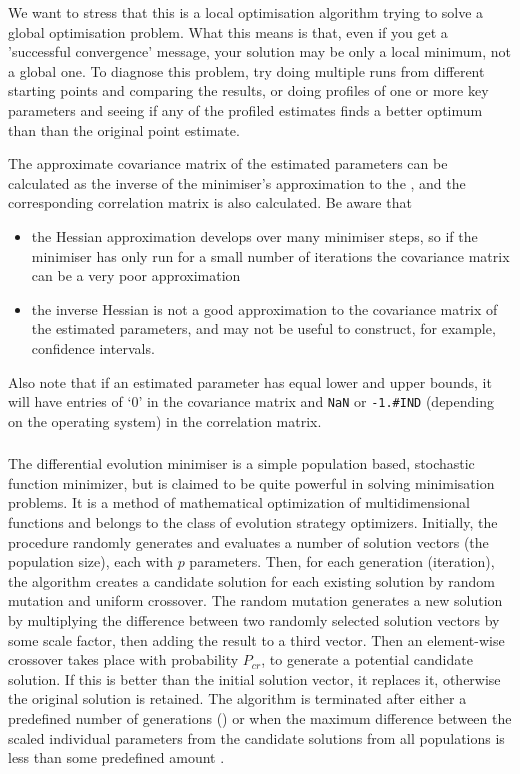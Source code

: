 We want to stress that this is a local optimisation algorithm trying to solve a global optimisation problem. What this means is that, even if you get a 'successful convergence' message, your solution may be only a local minimum, not a global one. To diagnose this problem, try doing multiple runs from different starting points and comparing the results, or doing profiles of one or more key parameters and seeing if any of the profiled estimates finds a better optimum than than the original point estimate.

The approximate covariance matrix of the estimated parameters can be calculated as the inverse of the minimiser's approximation to the , and the corresponding correlation matrix is also calculated. Be aware that

\begin{itemize}
\item the Hessian approximation develops over many minimiser steps, so if the minimiser has only run for a small number of iterations the covariance matrix can be a very poor approximation
\item the inverse Hessian is not a good approximation to the covariance matrix of the estimated parameters, and may not be useful to construct, for example, confidence intervals. 
\end{itemize}

Also note that if an estimated parameter has equal lower and upper bounds, it will have entries of `0' in the covariance matrix and \texttt{NaN} or \texttt{-1.\#IND} (depending on the operating system) in the correlation matrix. 

\subsubsection{}

The differential evolution minimiser is a simple population based, stochastic function minimizer, but is claimed to be quite powerful in solving minimisation problems. It is a method of mathematical optimization of multidimensional functions and belongs to the class of evolution strategy optimizers. Initially, the procedure randomly generates and evaluates a number of solution vectors (the population size), each with $p$ parameters. Then, for each generation (iteration), the algorithm creates a candidate solution for each existing solution by random mutation and uniform crossover. The random mutation generates a new solution by multiplying the difference between two randomly selected solution vectors by some scale factor, then adding the result to a third vector. Then an element-wise crossover takes place with probability $P_{cr}$, to generate a potential candidate solution. If this is better than the initial solution vector, it replaces it, otherwise the original solution is retained. The algorithm is terminated after either a predefined number of generations () or when the maximum difference between the scaled individual parameters from the candidate solutions from all populations is less than some predefined amount .

